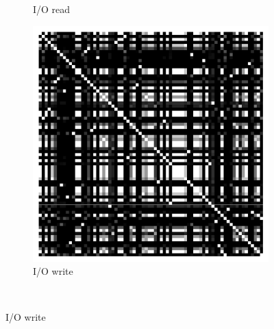 \begin{figure}[t]
\begin{subfigure}{0.19\textwidth}
                \caption{I/O read}
        \end{subfigure}
        \begin{subfigure}{0.19\textwidth}
                \includegraphics[width=\linewidth]{Figures/hadoop-iowrite-commitX.pdf}
                \caption{I/O write}
        \end{subfigure}
        
        \\ 


\end{figure}
